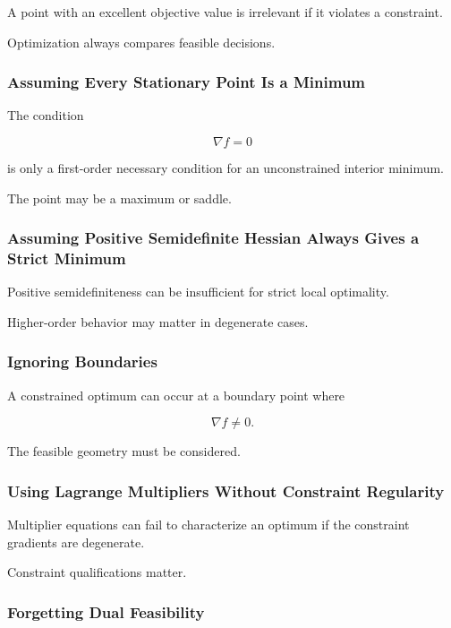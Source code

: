 A point with an excellent objective value is irrelevant if it violates a
constraint.

Optimization always compares feasible decisions.

\subsubsection{Assuming Every Stationary Point Is a Minimum}

The condition

\[
\nabla f=0
\]

is only a first-order necessary condition for an unconstrained interior
minimum.

The point may be a maximum or saddle.

\subsubsection{Assuming Positive Semidefinite Hessian Always Gives a Strict Minimum}

Positive semidefiniteness can be insufficient for strict local
optimality.

Higher-order behavior may matter in degenerate cases.

\subsubsection{Ignoring Boundaries}

A constrained optimum can occur at a boundary point where

\[
\nabla f\neq0.
\]

The feasible geometry must be considered.

\subsubsection{Using Lagrange Multipliers Without Constraint Regularity}

Multiplier equations can fail to characterize an optimum if the
constraint gradients are degenerate.

Constraint qualifications matter.

\subsubsection{Forgetting Dual Feasibility}

